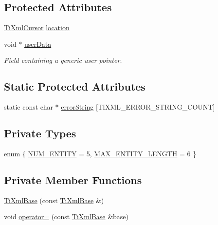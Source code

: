 \subsection*{Protected Attributes}
\begin{DoxyCompactItemize}
\item 
\hyperlink{struct_ti_xml_cursor}{TiXmlCursor} \hyperlink{class_ti_xml_base_a0d992580f3bc264909f898e942677a3c}{location}
\item 
void $\ast$ \hyperlink{class_ti_xml_base_ab242c01590191f644569fa89a080d97c}{userData}
\begin{DoxyCompactList}\small\item\em Field containing a generic user pointer. \end{DoxyCompactList}\end{DoxyCompactItemize}
\subsection*{Static Protected Attributes}
\begin{DoxyCompactItemize}
\item 
static const char $\ast$ \hyperlink{class_ti_xml_base_a7ac8feec4100e446b3d78e1ac0659700}{errorString} \mbox{[}TIXML\_\-ERROR\_\-STRING\_\-COUNT\mbox{]}
\end{DoxyCompactItemize}
\subsection*{Private Types}
\begin{DoxyCompactItemize}
\item 
enum \{ \hyperlink{class_ti_xml_base_a0b88b686bcd6dd0012404edfe2343034ab848893c6d03fcd8f42941d7079ccb47}{NUM\_\-ENTITY} =  5, 
\hyperlink{class_ti_xml_base_a0b88b686bcd6dd0012404edfe2343034aeb571e41586d47e28f60445cb9b41d49}{MAX\_\-ENTITY\_\-LENGTH} =  6
 \}
\end{DoxyCompactItemize}
\subsection*{Private Member Functions}
\begin{DoxyCompactItemize}
\item 
\hyperlink{class_ti_xml_base_a626975d7fb27b0a471142ca582b561b4}{TiXmlBase} (const \hyperlink{class_ti_xml_base}{TiXmlBase} \&)
\item 
void \hyperlink{class_ti_xml_base_a183315aa6f1bb36d509b179e912cb93f}{operator=} (const \hyperlink{class_ti_xml_base}{TiXmlBase} \&base)
\end{DoxyCompactItemize}
